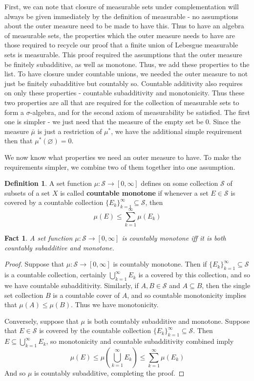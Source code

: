 \documentclass{article}
\theoremstyle{definition}
\newtheorem{definition}{Definition}[section]
\theoremstyle{plain}
\theoremstyle{theorem}
\newtheorem{fact}{Fact}[section]
\begin{document}
First, we can note that closure of measurable sets under complementation will always be given immediately by the definition of measurable - no assumptions about the outer measure need to be made to have this. Thus to have an algebra of measurable sets, the properties which the outer measure needs to have are those required to recycle our proof that a finite union of Lebesgue measurable sets is measurable. This proof required the assumptions that the outer measure be finitely subadditive, as well as monotone. Thus, we add these properties to the list. To have closure under countable unions, we needed the outer measure to not just be finitely subadditive but countably so. Countable additivity also requires on only these properties - countable subadditivity and monotonicity. Thus these two properties are all that are required for the collection of measurable sets to form a $\sigma$-algebra, and for the second axiom of measurability be satisfied. The first one is simpler - we just need that the measure of the empty set be $0$. Since the measure $\bar{\mu}$ is just a restriction of $\mu^*$, we have the additional simple requirement then that $\mu^*(\varnothing) = 0$. \par 
We now know what properties we need an outer measure to have. To make the requirements simpler, we combine two of them together into one assumption.
\begin{definition}
	A set function $\mu:\mathcal{S} \to [0,\infty]$ defines on some collection $\mathcal{S}$ of subsets of a set $X$ is called \textbf{countable monotone} if whenever a set $E \in \mathcal{S}$ is covered by a countable collection $\{E_k\}_{k=1}^{\infty} \subseteq \mathcal{S}$, then 
	\[ \mu(E) \leq \sum_{k=1}^{\infty} \mu(E_k) \]
\end{definition}
\begin{fact}
	A set function $\mu:\mathcal{S} \to [0,\infty]$ is countably monotone iff it is both countably subadditive and monotone.
\end{fact}
\begin{proof}
	Suppose that $\mu:\mathcal{S} \to [0,\infty]$ is countably monotone. Then if $\{E_k\}_{k=1}^{\infty} \subseteq \mathcal{S}$ is a countable collection, certainly $\bigcup_{k=1}^{\infty}E_k$ is a covered by this collection, and so we have countable subadditivity. Similarly, if $A,B \in \mathcal{S}$ and $A \subseteq B$, then the single set collection $B$ is a countable cover of $A$, and so countable monotonicity implies that $\mu(A) \leq \mu(B)$. Thus we have monotonicity. \par
	Conversely, suppose that $\mu$ is both countably subadditive and monotone. Suppose that $E \in \mathcal{S}$ is covered by the countable collection $\{E_k\}_{k=1}^{\infty} \subseteq \mathcal{S}$. Then $E \subseteq \bigcup_{k=1}^{\infty} E_k$, so monotonicity and countable subadditivity combined imply
	\[ \mu(E) \leq \mu \left( \bigcup_{k=1}^{\infty} E_k \right) \leq \sum_{k=1}^{\infty} \mu(E_k)  \]
	And so $\mu$ is countably subadditive, completing the proof.
\end{proof}
\end{document}
